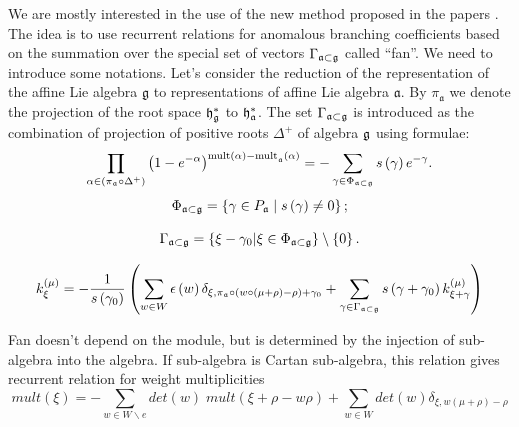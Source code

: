\documentclass[a4paper,12pt]{article}
\theoremstyle{definition} \newtheorem{Def}{Definition}
\begin{document}
We are mostly interested in the use of the new method proposed in the papers
\cite{lyakhovsky1996rra,lyakhovsky2007dub,ilyin812pbc,kulish4sfa}. The
idea is to use recurrent relations for anomalous branching
coefficients based on the summation over the special
set of vectors $\Gamma_{\frak{a}\subset \frak{g}} $ called ``fan''. We
need to introduce some notations. Let's consider the reduction of the
representation of the affine Lie algebra $\mathfrak{g}$ to 
representations of affine Lie algebra $\mathfrak{a}$. By
$\pi_{\mathfrak{a}}$ we denote the projection of the root space
$\frak{h}_{\frak{g}}^{\ast }$ to $\frak{h}_{\frak{a}}^{\ast }$. The
set $\Gamma_{\frak{a}\subset \frak{g}} $ is introduced as the
combination of projection of positive roots $\Delta^{+}$ of algebra
$\frak{g}$ using formulae:
\begin{equation}
  \label{eq:7}
  \prod_{\alpha \in \left( \pi _{\frak{a}}\circ \Delta ^{+}\right) }\left(
    1-e^{-\alpha }\right) ^{\mathrm{{mult}\left( \alpha \right) -{mult}}_{\frak{a%
      }}\mathrm{\left( \alpha \right) }}=-\sum_{\gamma \in \Phi _{\frak{a}\subset 
      \frak{g}}}s\left( \gamma \right) e^{-\gamma }.  
\end{equation}
\begin{equation}
\label{eq:18}
  \Phi _{\frak{a}\subset \frak{g}}=\left\{ \gamma \in P_{\frak{a}}\mid s\left(
      \gamma \right) \neq 0\right\} ;  
\end{equation}

\begin{equation}
\label{eq:19}
  \Gamma_{\frak{a}\subset \frak{g}}=\left\{ \xi -\gamma _{0}|\xi \in \Phi _{%
      \frak{a}\subset \frak{g}}\right\} \setminus \left\{ 0\right\} . 
\end{equation}



\begin{equation}
  \label{recurrent-relation}
  k_{\xi }^{\left( \mu \right) }=-\frac{1}{s\left( \gamma _{0}\right) }\left(
    \sum_{w\in W}\epsilon \left( w\right) \delta _{\xi ,\pi _{\frak{a}}\circ
      \left( w\circ (\mu +\rho )-\rho \right) +\gamma _{0}}+\sum_{\gamma \in
      \Gamma _{\frak{a}\subset \frak{g}}}s\left( \gamma +\gamma _{0}\right) k_{\xi
      +\gamma }^{\left( \mu \right) }\right)   
\end{equation}

Fan doesn't depend on the module, but
is determined by the injection of sub-algebra into the algebra. If 
sub-algebra is Cartan sub-algebra, this relation gives recurrent
relation for weight multiplicities
\begin{equation}
  \label{eq:2}
  mult(\xi)=-\sum_{w\in W\backslash e}det(w)\;mult(\xi+\rho-w\rho)+\sum_{w\in W}det(w)\delta_{\xi,w(\mu+\rho)-\rho}
\end{equation}
\end{document}

